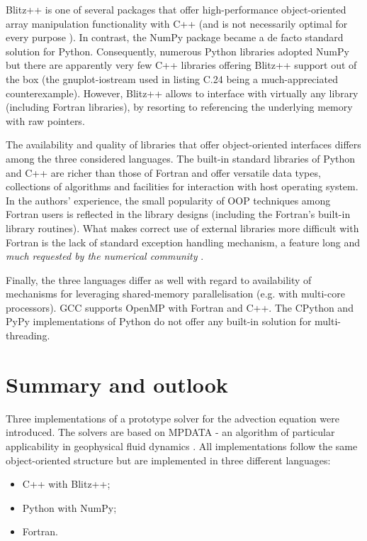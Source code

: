 \documentclass[review,peprint,10pt,5p,times]{elsarticle}
\begin{document}
  Blitz++ is one of several packages that offer high-performance object-oriented
    array manipulation functionality with C++ (and is not necessarily optimal for every
    purpose \citep{Iglberger_et_al_2012}).
  In contrast, the NumPy package became a de facto standard solution for Python.
  Consequently, numerous Python libraries adopted NumPy but
    there are apparently very few C++ libraries offering Blitz++ support out of the box
    (the gnuplot-iostream used in listing C.24 being a much-appreciated counterexample).
  However, Blitz++ allows to interface with virtually any library (including Fortran libraries), 
    by resorting to referencing the underlying memory with raw pointers.
 
  The availability and quality of libraries 
    that offer object-oriented interfaces
    differs among the three considered languages.
  The built-in standard libraries of Python and C++ are richer than
    those of Fortran and offer versatile data types, collections of
    algorithms and facilities for interaction with host operating system.
  In the authors' experience, the small popularity of OOP techniques among
    Fortran users is reflected in the library designs (including the Fortran's
    built-in library routines).
  What makes correct use of external libraries more difficult with Fortran
    is the lack of standard exception handling mechanism, a feature
    long and {\em much requested by the numerical community} \citep[][Foreword]{Press_et_al_1996}.

  Finally, the three languages differ as well with regard to availability of 
    mechanisms for leveraging shared-memory parallelisation (e.g. with multi-core processors).
  GCC supports OpenMP with Fortran and C++.
  The CPython and PyPy implementations of Python do not offer any
    built-in solution for multi-threading. 
  
  \section{Summary and outlook}

  Three implementations of a prototype solver 
    for the advection equation were introduced.
  The solvers are based on MPDATA - an algorithm of particular applicability
    in geophysical fluid dynamics \citep{Smolarkiewicz_2006}.
  All implementations follow the same object-oriented structure but are implemented
    in three different languages:
  \begin{itemize}
    \item{C++ with Blitz++;}
    \item{Python with NumPy;}
    \item{Fortran.}
  \end{itemize}
\end{document}
